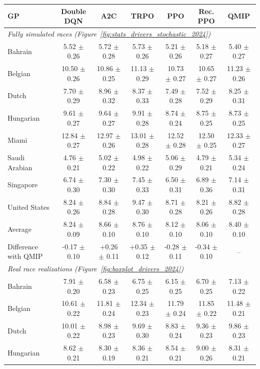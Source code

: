 \begin{tabular}{lcccccc}
\toprule
GP & Double DQN & A2C & TRPO & PPO & Rec. PPO & QMIP \\
\midrule
\multicolumn{7}{l}{\textit{Fully simulated races (Figure~\ref{fig:stats_drivers_stochastic_2024})}} \\
\midrule
Bahrain & 5.52 $\pm$ 0.26 & 5.72 $\pm$ 0.28 & 5.73 $\pm$ 0.26 & 5.21 $\pm$ 0.26 & 5.18 $\pm$ 0.27 & 5.40 $\pm$ 0.27 \\
Belgian & 10.50 $\pm$ 0.26 & 10.86 $\pm$ 0.25 & 11.13 $\pm$ 0.29 & 10.73 $\pm$ 0.27 & 10.65 $\pm$ 0.27 & 11.23 $\pm$ 0.26 \\
Dutch & 7.70 $\pm$ 0.29 & 8.96 $\pm$ 0.32 & 8.37 $\pm$ 0.33 & 7.49 $\pm$ 0.28 & 7.52 $\pm$ 0.29 & 8.25 $\pm$ 0.31 \\
Hungarian & 9.61 $\pm$ 0.27 & 9.64 $\pm$ 0.27 & 9.91 $\pm$ 0.28 & 8.74 $\pm$ 0.24 & 8.75 $\pm$ 0.25 & 8.73 $\pm$ 0.25 \\
Miami & 12.84 $\pm$ 0.27 & 12.97 $\pm$ 0.26 & 13.01 $\pm$ 0.28 & 12.52 $\pm$ 0.28 & 12.50 $\pm$ 0.25 & 12.33 $\pm$ 0.27 \\
Saudi Arabian & 4.76 $\pm$ 0.21 & 5.02 $\pm$ 0.22 & 4.98 $\pm$ 0.22 & 5.06 $\pm$ 0.29 & 4.79 $\pm$ 0.21 & 5.34 $\pm$ 0.24 \\
Singapore & 6.74 $\pm$ 0.30 & 7.30 $\pm$ 0.30 & 7.45 $\pm$ 0.33 & 6.50 $\pm$ 0.31 & 6.89 $\pm$ 0.36 & 7.14 $\pm$ 0.31 \\
United States & 8.24 $\pm$ 0.26 & 8.84 $\pm$ 0.28 & 9.47 $\pm$ 0.30 & 8.71 $\pm$ 0.28 & 8.21 $\pm$ 0.26 & 8.82 $\pm$ 0.28 \\
\midrule
Average & 8.24 $\pm$ 0.09 & 8.66 $\pm$ 0.10 & 8.76 $\pm$ 0.10 & 8.12 $\pm$ 0.10 & 8.06 $\pm$ 0.10 & 8.40 $\pm$ 0.10 \\
Difference with QMIP & -0.17 $\pm$ 0.10 & +0.26 $\pm$ 0.11 & +0.35 $\pm$ 0.12 & -0.28 $\pm$ 0.11 & -0.34 $\pm$ 0.10 & -- \\
\midrule
\multicolumn{7}{l}{\textit{Real race realizations (Figure~\ref{fig:boxplot_drivers_2024})}} \\
\midrule
Bahrain & 7.91 $\pm$ 0.20 & 6.58 $\pm$ 0.23 & 6.75 $\pm$ 0.25 & 6.15 $\pm$ 0.25 & 6.70 $\pm$ 0.25 & 7.13 $\pm$ 0.22 \\
Belgian & 10.61 $\pm$ 0.22 & 11.81 $\pm$ 0.24 & 12.34 $\pm$ 0.23 & 11.79 $\pm$ 0.24 & 11.85 $\pm$ 0.22 & 11.48 $\pm$ 0.21 \\
Dutch & 10.01 $\pm$ 0.22 & 8.98 $\pm$ 0.23 & 9.69 $\pm$ 0.30 & 8.83 $\pm$ 0.24 & 9.36 $\pm$ 0.23 & 9.86 $\pm$ 0.23 \\
Hungarian & 8.62 $\pm$ 0.21 & 8.30 $\pm$ 0.19 & 8.36 $\pm$ 0.21 & 8.54 $\pm$ 0.21 & 9.00 $\pm$ 0.26 & 8.31 $\pm$ 0.21 \\

\end{tabular}
